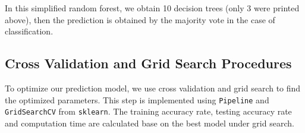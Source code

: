 \documentclass[11pt,a4paper]{article}
\begin{document}
    \newpage
    \noindent
    In this simplified random forest, we obtain 10 decision trees (only 3 were printed above), then the prediction is obtained by the majority vote in the case of classification.
    
    
    \subsection{Cross Validation and Grid Search Procedures}
    To optimize our prediction model, we use cross validation and grid search to find the optimized parameters. This step is implemented using \texttt{Pipeline} and \texttt{GridSearchCV} from \texttt{sklearn}. The training accuracy rate, testing accuracy rate and computation time are calculated base on the best model under grid search. \\









        
\end{document}
